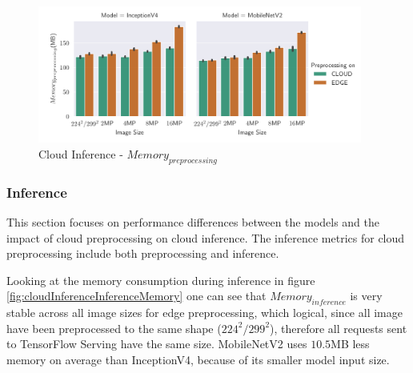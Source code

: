 \begin{figure}[H]
\centering
\includegraphics[width=0.95\textwidth]{./Bilder/single_plots/cloud_inference_plots/Cloud_Inference_Preprocessing_Memory.pdf}
\caption{Cloud Inference -  $Memory_{preprocessing}$}
\label{fig:cloudInferencePreproMemory}
\end{figure}


\subsubsection{Inference}
This section focuses on performance differences between the models and the impact of cloud preprocessing on cloud inference.
The inference metrics for cloud preprocessing include both preprocessing and inference.


Looking at the memory consumption during inference in figure \ref{fig:cloudInferenceInferenceMemory} one can see that $Memory_{inference}$ is very stable across all image sizes for edge preprocessing, which logical, since all image have been preprocessed to the same shape ($224^2/299^2$), therefore all requests sent to TensorFlow Serving have the same size.
MobileNetV2 uses $10.5$MB less memory on average than InceptionV4, because of its smaller model input size.

